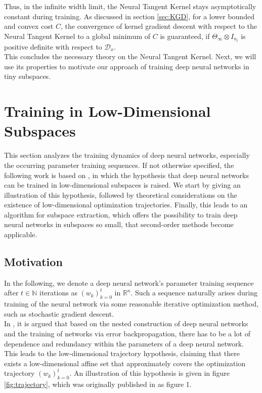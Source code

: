 \documentclass[11pt, a4paper]{article}
\newcommand{\N}{\mathbb{N}}
\newcommand{\R}{\mathbb{R}}
\newcommand{\D}{\mathcal{D}}
\begin{document}
Thus, in the infinite width limit, the Neural Tangent Kernel stays asymptotically constant during training. As discussed in section \ref{sec:KGD}, for a lower bounded and convex cost $C$, the convergence of kernel gradient descent with respect to the Neural Tangent Kernel to a global minimum of $C$ is guaranteed, if $\Theta_{\infty} \otimes I_{n_l}$ is positive definite with respect to $\D_x$. \\

This concludes the necessary theory on the Neural Tangent Kernel. Next, we will use its properties to motivate our approach of training deep neural networks in tiny subspaces.

\pagebreak
\section{Training in Low-Dimensional Subspaces} \label{sec:subspaces}

This section analyzes the training dynamics of deep neural networks, especially the occurring parameter training sequences.
If not otherwise specified, the following work is based on \cite{Paper}, in which the hypothesis that deep neural networks can be trained in low-dimensional subspaces is raised. We start by giving an illustration of this hypothesis, followed by theoretical considerations on the existence of low-dimensional optimization trajectories. Finally, this leads to an algorithm for subspace extraction, which offers the possibility to train deep neural networks in subspaces so small, that second-order methods become applicable.

\subsection{Motivation}

In the following, we denote a deep neural network's parameter training sequence after $t \in \N$ iterations as $(w_k)_{k=0}^t$ in $\R^n$. Such a sequence naturally arises during training of the neural network via some reasonable iterative optimization method, such as stochastic gradient descent. \\

In \cite{Paper}, it is argued that based on the nested construction of deep neural networks and the training of networks via error backpropagation, there has to be a lot of dependence and redundancy within the parameters of a deep neural network. This leads to the low-dimensional trajectory hypothesis, claiming that there exists a low-dimensional affine set that approximately covers the optimization trajectory $(w_k)_{k=0}^t$. An illustration of this hypothesis is given in figure \ref{fig:trajectory}, which was originally published in \cite{Paper} as figure 1.
\end{document}
